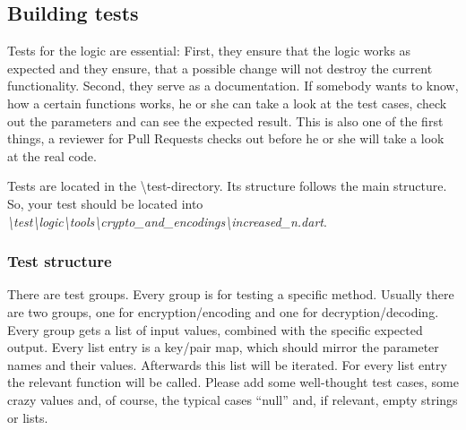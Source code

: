\subsection{Building tests}
Tests for the logic are essential: First, they ensure that the logic works as expected and they ensure, that a possible change will not destroy the current functionality. Second, they serve as a documentation. If somebody wants to know, how a certain functions works, he or she can take a look at the test cases, check out the parameters and can see the expected result. This is also one of the first things, a reviewer for Pull Requests checks out before he or she will take a look at the real code.\par
\bigskip
Tests are located in the \textbackslash test-directory. Its structure follows the main structure. \newline
So, your test should be located into \emph{\textbackslash test\textbackslash logic\textbackslash tools\textbackslash crypto\_and\_encodings\textbackslash increased\_n.dart}.

\subsubsection{Test structure}
There are test groups. Every group is for testing a specific method. Usually there are two groups, one for encryption/encoding and one for decryption/decoding. Every group gets a list of input values, combined with the specific expected output.  Every list entry is a key/pair map, which should mirror the parameter names and their values. Afterwards this list will be iterated. For every list entry the relevant function will be called. Please add some well-thought test cases, some crazy values and, of course, the typical cases \enquote{null} and, if relevant, empty strings or lists.


